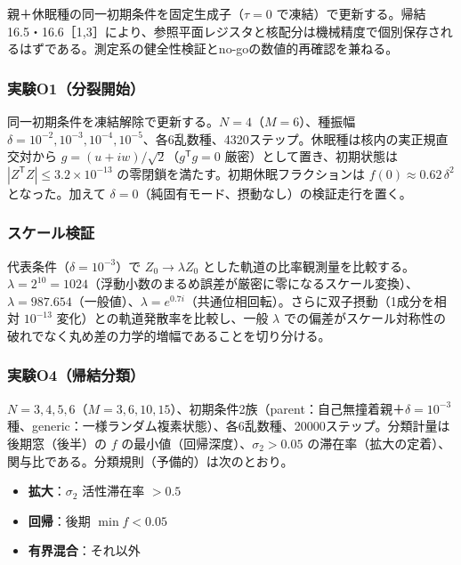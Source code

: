 \documentclass[
  a4paper,
]{ltjsarticle}
\providecommand{\tightlist}{%
  \setlength{\itemsep}{0pt}\setlength{\parskip}{0pt}}
\begin{document}
親＋休眠種の同一初期条件を固定生成子（\(\tau=0\)
で凍結）で更新する。帰結16.5・16.6［1,3］により、参照平面レジスタと核配分は機械精度で個別保存されるはずである。測定系の健全性検証とno-goの数値的再確認を兼ねる。

\subsubsection{実験O1（分裂開始）}\label{ux5b9fux9a13o1ux5206ux88c2ux958bux59cb}

同一初期条件を凍結解除で更新する。\(N=4\)（\(M=6\)）、種振幅
\(\delta=10^{-2},10^{-3},10^{-4},10^{-5}\)、各6乱数種、4320ステップ。休眠種は核内の実正規直交対から
\(g=(u+iw)/\sqrt2\)（\(g^{\mathsf T}g=0\) 厳密）として置き、初期状態は
\(|Z^{\mathsf T}Z|\le3.2\times10^{-13}\)
の零閉鎖を満たす。初期休眠フラクションは \(f(0)\approx0.62\,\delta^2\)
となった。加えて
\(\delta=0\)（純固有モード、摂動なし）の検証走行を置く。

\subsubsection{スケール検証}\label{ux30b9ux30b1ux30fcux30ebux691cux8a3c}

代表条件（\(\delta=10^{-3}\)）で \(Z_0\to\lambda Z_0\)
とした軌道の比率観測量を比較する。\(\lambda=2^{10}=1024\)（浮動小数のまるめ誤差が厳密に零になるスケール変換）、\(\lambda=987.654\)（一般値）、\(\lambda=e^{0.7i}\)（共通位相回転）。さらに双子摂動（1成分を相対
\(10^{-13}\) 変化）との軌道発散率を比較し、一般 \(\lambda\)
での偏差がスケール対称性の破れでなく丸め差の力学的増幅であることを切り分ける。

\subsubsection{実験O4（帰結分類）}\label{ux5b9fux9a13o4ux5e30ux7d50ux5206ux985e}

\(N=3,4,5,6\)（\(M=3,6,10,15\)）、初期条件2族（parent：自己無撞着親＋\(\delta=10^{-3}\)
種、generic：一様ランダム複素状態）、各6乱数種、20000ステップ。分類計量は後期窓（後半）の
\(f\) の最小値（回帰深度）、\(\sigma_2>0.05\)
の滞在率（拡大の定着）、関与比である。分類規則（予備的）は次のとおり。

\begin{itemize}
\tightlist
\item
  \textbf{拡大}：\(\sigma_2\) 活性滞在率 \(>0.5\)
\item
  \textbf{回帰}：後期 \(\min f<0.05\)
\item
  \textbf{有界混合}：それ以外
\end{itemize}
\end{document}
